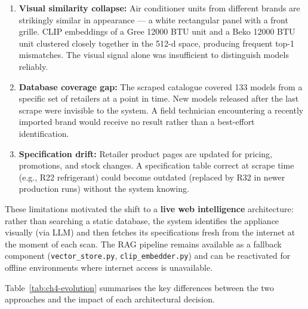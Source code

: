\begin{enumerate}
  \item \textbf{Visual similarity collapse:} Air conditioner units from different brands are strikingly similar in appearance — a white rectangular panel with a front grille. CLIP embeddings of a Gree 12000 BTU unit and a Beko 12000 BTU unit clustered closely together in the 512-d space, producing frequent top-1 mismatches. The visual signal alone was insufficient to distinguish models reliably.

  \item \textbf{Database coverage gap:} The scraped catalogue covered 133 models from a specific set of retailers at a point in time. New models released after the last scrape were invisible to the system. A field technician encountering a recently imported brand would receive no result rather than a best-effort identification.

  \item \textbf{Specification drift:} Retailer product pages are updated for pricing, promotions, and stock changes. A specification table correct at scrape time (e.g., R22 refrigerant) could become outdated (replaced by R32 in newer production runs) without the system knowing.
\end{enumerate}

These limitations motivated the shift to a \textbf{live web intelligence} architecture: rather than searching a static database, the system identifies the appliance visually (via LLM) and then fetches its specifications fresh from the internet at the moment of each scan. The RAG pipeline remains available as a fallback component (\texttt{vector\_store.py}, \texttt{clip\_embedder.py}) and can be reactivated for offline environments where internet access is unavailable.

Table~\ref{tab:ch4-evolution} summarises the key differences between the two approaches and the impact of each architectural decision.

